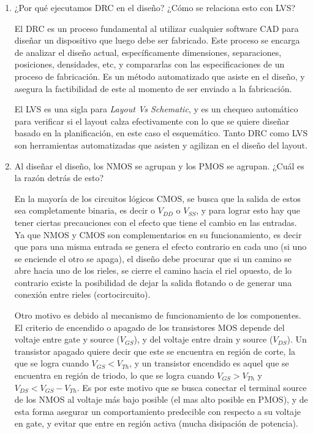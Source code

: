 \documentclass[letterpaper, 12pt]{article}
\numberwithin{equation}{section}
\begin{document}
\begin{enumerate}
  \item ¿Por qué ejecutamos DRC en el diseño? ¿Cómo se relaciona esto con LVS?

    El DRC es un proceso fundamental al utilizar cualquier software CAD para diseñar un dispositivo que luego debe ser fabricado. Este proceso se encarga de analizar el diseño actual, específicamente dimensiones, separaciones, posiciones, densidades, etc, y compararlas con las especificaciones de un proceso de fabricación. Es un método automatizado que asiste en el diseño, y asegura la factibilidad de este al momento de ser enviado a la fabricación.

    El LVS es una sigla para \emph{Layout Vs Schematic}, y es un chequeo automático para verificar si el layout calza efectivamente con lo que se quiere diseñar basado en la planificación, en este caso el esquemático. Tanto DRC como LVS son herramientas automatizadas que asisten y agilizan en el diseño del layout.

  \item Al diseñar el diseño, los NMOS se agrupan y los PMOS se agrupan. ¿Cuál es la razón detrás de esto?

    En la mayoría de los circuitos lógicos CMOS, se busca que la salida de estos sea completamente binaria, es decir o \(V_{DD}\) o \(V_{SS}\), y para lograr esto hay que tener ciertas precauciones con el efecto que tiene el cambio en las entradas. Ya que NMOS y CMOS son complementarios en su funcionamiento, es decir que para una misma entrada se genera el efecto contrario en cada uno (si uno se enciende el otro se apaga), el diseño debe procurar que si un camino se abre hacia uno de los rieles, se cierre el camino hacia el riel opuesto, de lo contrario existe la posibilidad de dejar la salida flotando o de generar una conexión entre rieles (cortocircuito).

    Otro motivo es debido al mecanismo de funcionamiento de los componentes. El criterio de encendido o apagado de los transistores MOS depende del voltaje entre gate y source (\(V_{GS}\)), y del voltaje entre drain y source (\(V_{DS}\)). Un transistor apagado quiere decir que este se encuentra en región de corte, la que se logra cuando \(V_{GS} < V_{Th}\), y un transistor encendido es aquel que se encuentra en región de triodo, lo que se logra cuando \(V_{GS} > V_{Th}\) y \(V_{DS} < V_{GS} - V_{Th}\). Es por este motivo que se busca conectar el terminal source de los NMOS al voltaje más bajo posible (el mas alto posible en PMOS), y de esta forma asegurar un comportamiento predecible con respecto a su voltaje en gate, y evitar que entre en región activa (mucha disipación de potencia).


\end{enumerate}
\end{document}
